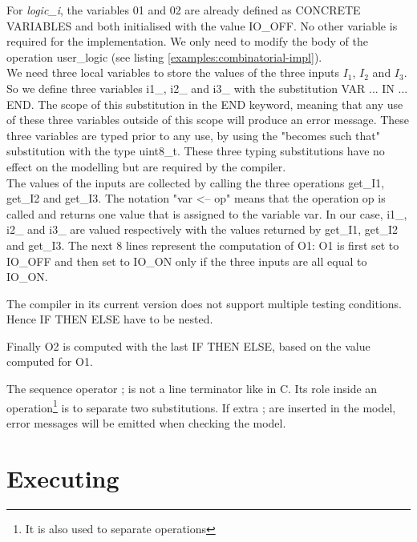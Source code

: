 

For \textit{logic\_i}, the variables 01 and 02 are already defined as CONCRETE\\VARIABLES and both initialised with the value IO\_OFF. No other variable is required for the implementation. We only need to modify the body of the operation user\_logic (see listing \ref{examples:combinatorial-impl}). \\
We need three local variables to store the values of the three inputs $I_1$, $I_2$ and $I_3$. So we define three variables i1\_, i2\_ and i3\_ with the substitution VAR ... IN ... END. The scope of this substitution in the END keyword, meaning that any use of these three variables outside of this scope will produce an error message. These three variables are typed prior to any use, by using the "becomes such that" substitution with the type uint8\_t. These three typing substitutions have no effect on the modelling but are required by the compiler.\\
The values of the inputs are collected by calling the three operations get\_I1, get\_I2 and get\_I3. The notation "var <-- op" means that the operation op is called and returns one value that is assigned to the variable var. In our case, i1\_, i2\_ and i3\_ are valued respectively with the values returned by get\_I1, get\_I2 and get\_I3.
The next 8 lines represent the computation of O1: O1 is first set to IO\_OFF and then set to IO\_ON only if the three inputs are all equal to IO\_ON. 
\begin{remark}
The compiler in its current version does not support multiple testing conditions. Hence IF THEN ELSE have to be nested. 
\end{remark}
Finally O2 is computed with the last IF THEN ELSE, based on the value computed for O1.
\begin{remark}
The sequence operator ; is not a line terminator like in C. Its role inside an operation\footnote{It is also used to separate operations} is to separate two substitutions. If extra ; are inserted in the model, error messages will be emitted when checking the model. 
\end{remark}

\section{Executing}

